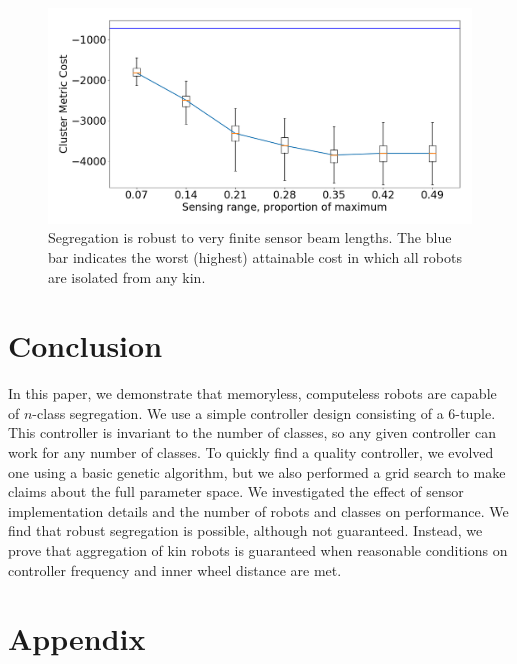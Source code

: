 \documentclass[conference]{IEEEtran}
\begin{document}
    \begin{figure}
      \centering
      \includegraphics[width=1\linewidth]{./images/beam_length.png}
      \caption{Segregation is robust to very finite sensor beam lengths. The blue bar indicates the worst (highest) attainable cost in which all robots are isolated from any kin.}
      \label{fig:beam_length}
    \end{figure}

\section{Conclusion}

  In this paper, we demonstrate that memoryless, computeless robots are capable of $n$-class segregation. We use a simple controller design consisting of a 6-tuple. This controller is invariant to the number of classes, so any given controller can work for any number of classes. To quickly find a quality controller, we evolved one using a basic genetic algorithm, but we also performed a grid search to make claims about the full parameter space. We investigated the effect of sensor implementation details and the number of robots and classes on performance. We find that robust segregation is possible, although not guaranteed. Instead, we prove that aggregation of kin robots is guaranteed when reasonable conditions on controller frequency and inner wheel distance are met.




\onecolumn
\appendix
\section{Appendix}
\end{document}
